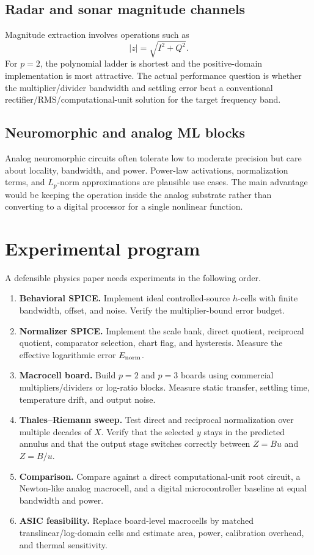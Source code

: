\documentclass[11pt]{article}
\begin{document}
\subsection{Radar and sonar magnitude channels}

Magnitude extraction involves operations such as
\[
        |z|=\sqrt{I^2+Q^2}.
\]
For \(p=2\), the polynomial ladder is shortest and the positive-domain
implementation is most attractive.  The actual performance question is whether
the multiplier/divider bandwidth and settling error beat a conventional
rectifier/RMS/computational-unit solution for the target frequency band.

\subsection{Neuromorphic and analog ML blocks}

Analog neuromorphic circuits often tolerate low to moderate precision but care
about locality, bandwidth, and power.  Power-law activations, normalization
terms, and \(L_p\)-norm approximations are plausible use cases.  The main
advantage would be keeping the operation inside the analog substrate rather
than converting to a digital processor for a single nonlinear function.

\section{Experimental program}

A defensible physics paper needs experiments in the following order.

\begin{enumerate}[leftmargin=2em]
\item \textbf{Behavioral SPICE.}  Implement ideal controlled-source \(h\)-cells
with finite bandwidth, offset, and noise.  Verify the multiplier-bound error
budget.
\item \textbf{Normalizer SPICE.}  Implement the scale bank, direct quotient,
reciprocal quotient, comparator selection, chart flag, and hysteresis.  Measure
the effective logarithmic error \(E_{\rm norm}\).
\item \textbf{Macrocell board.}  Build \(p=2\) and \(p=3\) boards using
commercial multipliers/dividers or log-ratio blocks.  Measure static transfer,
settling time, temperature drift, and output noise.
\item \textbf{Thales--Riemann sweep.}  Test direct and reciprocal
normalization over multiple decades of \(X\).  Verify that the selected
\(y\) stays in the predicted annulus and that the output stage switches
correctly between \(Z=Bu\) and \(Z=B/u\).
\item \textbf{Comparison.}  Compare against a direct computational-unit root
circuit, a Newton-like analog macrocell, and a digital microcontroller baseline
at equal bandwidth and power.
\item \textbf{ASIC feasibility.}  Replace board-level macrocells by matched
translinear/log-domain cells and estimate area, power, calibration overhead,
and thermal sensitivity.
\end{enumerate}
\end{document}
